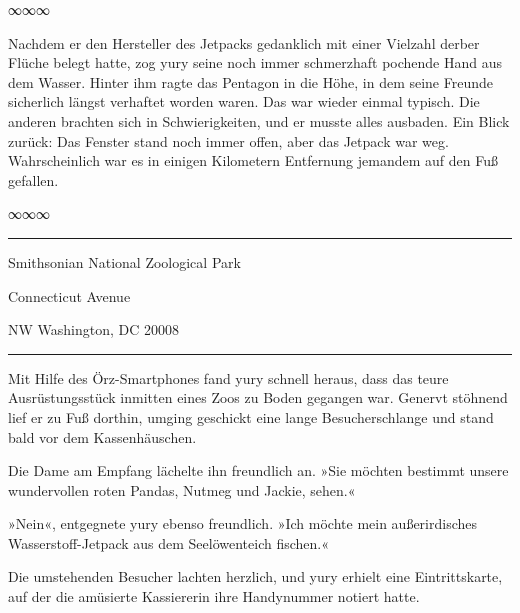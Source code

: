 \begin{center}
	∞∞∞
\end{center}

Nachdem er den Hersteller des Jetpacks gedanklich mit einer Vielzahl derber Flüche belegt hatte, zog yury seine noch immer schmerzhaft pochende Hand aus dem Wasser. Hinter ihm ragte das Pentagon in die Höhe, in dem seine Freunde sicherlich längst verhaftet worden waren. Das war wieder einmal typisch. Die anderen brachten sich in Schwierigkeiten, und er musste alles ausbaden. Ein Blick zurück: Das Fenster stand noch immer offen, aber das Jetpack war weg. Wahrscheinlich war es in einigen Kilometern Entfernung jemandem auf den Fuß gefallen.

\begin{center}
	∞∞∞
\end{center}

\noindent \parbox{\textwidth}{ \vspace{3ex} \hrule \vspace{3ex}

    \begin{tiny}
    \begin{ttfamily}

\noindent Smithsonian National Zoological Park

 Connecticut Avenue

\noindent NW Washington, DC 20008

    \end{ttfamily}
    \end{tiny}

\vspace{3ex} \hrule \vspace{3ex} }

Mit Hilfe des Örz-Smartphones fand yury schnell heraus, dass das teure Ausrüstungsstück inmitten eines Zoos zu Boden gegangen war. Genervt stöhnend lief er zu Fuß dorthin, umging geschickt eine lange Besucherschlange und stand bald vor dem Kassenhäuschen.

Die Dame am Empfang lächelte ihn freundlich an. »Sie möchten bestimmt unsere wundervollen roten Pandas, Nutmeg und Jackie, sehen.«

»Nein«, entgegnete yury ebenso freundlich. »Ich möchte mein außerirdisches Wasserstoff-Jetpack aus dem Seelöwenteich fischen.«

Die umstehenden Besucher lachten herzlich, und yury erhielt eine Eintrittskarte, auf der die amüsierte Kassiererin ihre Handynummer notiert hatte.

